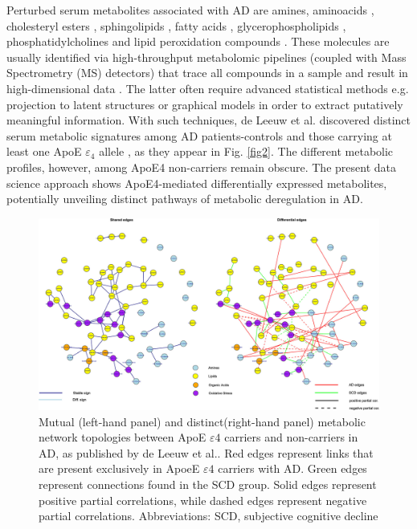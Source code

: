 \documentclass{amsart}
\theoremstyle{plain}
\begin{document}
Perturbed serum metabolites associated with AD are amines, aminoacids \cite{deLeeuw2017Blood-basedDisease, Green2023InvestigatingDisease}, cholesteryl esters \cite{Proitsi2017AssociationAnalysis}, sphingolipids \cite{Varma2018BrainStudy,Sun2022AssociationDisease,Green2023InvestigatingDisease,Oeckl2019GlialImpairment,Barupal2019SetsPathophysiology}, fatty acids \cite{Fernandez-Calle2022APOEDiseases,deLeeuw2017Blood-basedDisease}, glycerophospholipids \cite{Varma2018BrainStudy, Jia2022ATypes,Huo2020BrainAnalysis, Weng2019TheImpairment}, phosphatidylcholines \cite{Simpson2016BloodAging} and lipid peroxidation compounds \cite{Fernandez-Calle2022APOEDiseases}. These molecules are usually identified via high-throughput metabolomic pipelines (coupled with Mass Spectrometry (MS) detectors) that trace all compounds in a sample and result in high-dimensional data \cite{Oka2023MultiomicsCohort}. The latter often require advanced statistical methods e.g. projection to latent structures \cite{Weng2019TheImpairment, Peeters2019StableData} or graphical models \cite{Peeters2022Rags2ridges:Matrices} in order to extract putatively meaningful information. 
With such techniques, de Leeuw et al. discovered distinct serum metabolic signatures among AD patients-controls and those carrying at least one ApoE $\varepsilon_4$ allele \cite{deLeeuw2017Blood-basedDisease}, as they appear in Fig. \ref{fig2}. The different metabolic profiles, however, among ApoE4 non-carriers remain obscure. The present data science approach shows ApoE4-mediated differentially expressed metabolites, potentially unveiling distinct pathways of metabolic deregulation in AD.

\begin{figure}
\vspace*{-1cm}
  \includegraphics[width=\textwidth]{figures/network.jpeg}
    \caption{Mutual (left-hand panel) and distinct(right-hand panel) metabolic network topologies between ApoE $\varepsilon4$ carriers and non-carriers in AD, as published by de Leeuw et al.. Red edges represent links that are present exclusively in ApoeE $\varepsilon4$ carriers with AD. Green edges represent connections found in the SCD group. Solid edges represent positive partial correlations, while dashed edges represent negative partial correlations. Abbreviations: SCD, subjective cognitive decline }
  \label{fig3}
\end{figure}
\end{document}
